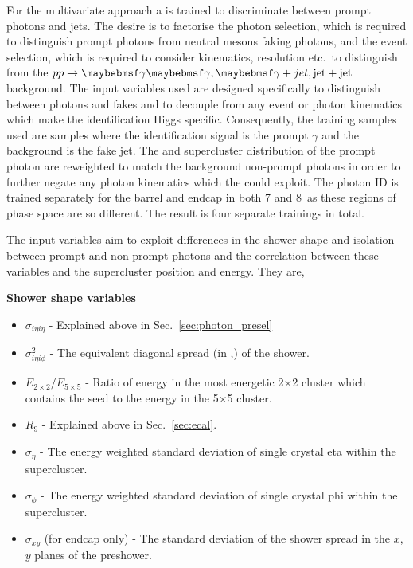 For the multivariate approach a \BDT is trained to discriminate between prompt photons and jets. The desire is to factorise the photon selection, which is required to distinguish prompt photons from neutral mesons faking photons, and the event selection, which is required to consider kinematics, resolution etc.~to distinguish \Hgg from the $pp\rightarrow\gamma\gamma, \gjet, \mathrm{jet}+\mathrm{jet}$ background. The input variables used are designed specifically to distinguish between photons and fakes and to decouple from any event or photon kinematics which make the identification Higgs specific. Consequently, the training samples used are \gjet samples where the identification \BDT signal is the prompt $\gamma$ and the background is the fake jet. The \pT and supercluster \eta distribution of the prompt photon are reweighted to match the background non-prompt photons in order to further negate any photon kinematics which the \BDT could exploit. The photon ID \BDT is trained separately for the barrel and endcap in both 7 and 8~\TeV as these regions of phase space are so different. The result is four separate trainings in total.

The input variables aim to exploit differences in the shower shape and isolation between prompt and non-prompt photons and the correlation between these variables and the supercluster position and energy. They are,

\noindent\textbf{Shower shape variables}
\begin{itemize}
  \item $\sigma_{i\eta i\eta}$ - Explained above in Sec.~\ref{sec:photon_presel}
  \item $\sigma^{2}_{i\eta i\phi}$ - The equivalent diagonal spread (in \eta,\phi) of the shower.
  \item $E_{2\times2}/E_{5\times5}$ - Ratio of energy in the most energetic 2$\times$2 cluster which contains the seed to the energy in the 5$\times$5 cluster.
  \item $R_{9}$ - Explained above in Sec.~\ref{sec:ecal}.
  \item $\sigma_{\eta}$ - The energy weighted standard deviation of single crystal eta within the supercluster.
  \item $\sigma_{\phi}$ - The energy weighted standard deviation of single crystal phi within the supercluster.
  \item $\sigma_{xy}$ (for endcap only) - The standard deviation of the shower spread in the $x$, $y$ planes of the preshower.
\end{itemize}

